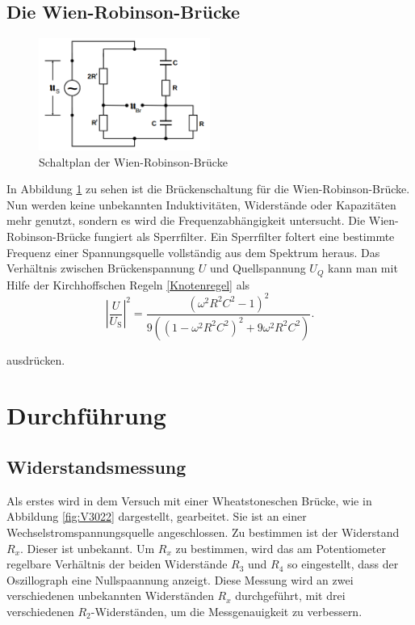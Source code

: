 \documentclass[
  bibliography=totoc,     %
  captions=tableheading,  %
  titlepage=firstiscover, %
]{scrartcl}
\begin{document}
\newpage
\subsection{Die Wien-Robinson-Brücke}
\begin{figure}[htb]
  \centering
  \includegraphics[width=0.5\textwidth]{V3026.png}
  \caption{Schaltplan der Wien-Robinson-Brücke}
  \label{fig:V3026}
\end{figure}
In Abbildung \ref{fig:V3026} zu sehen ist die Brückenschaltung für die
Wien-Robinson-Brücke. Nun werden keine unbekannten Induktivitäten, Widerstände
oder Kapazitäten mehr genutzt, sondern es wird die Frequenzabhängigkeit
untersucht. Die Wien-Robinson-Brücke fungiert als Sperrfilter. Ein Sperrfilter
foltert eine bestimmte Frequenz einer Spannungsquelle vollständig aus dem
Spektrum heraus. Das Verhältnis zwischen Brückenspannung $U$ und Quellspannung
$U_Q$ kann man mit Hilfe der Kirchhoffschen Regeln \ref{Knotenregel} als
\begin{equation}
    \label{eq:wien_robinson_1}
    \left|\frac{U}{U_{\mathup{S}}}\right|^2 = \frac{\left(\omega^2 R^2 C^2 - 1\right)^2}{9\left(\left(1 - \omega^2 R^2 C^2\right)^2 + 9 \omega^2 R^2 C^2\right)}.
\end{equation}

ausdrücken.
\newpage
\section{Durchführung}
\label{sec:durchführung}
\subsection{Widerstandsmessung}
Als erstes wird in dem Versuch mit einer Wheatstoneschen Brücke, wie in
Abbildung \ref{fig:V3022} dargestellt, gearbeitet. Sie ist an einer
Wechselstromspannungsquelle angeschlossen. Zu bestimmen ist der Widerstand $R_x$.
Dieser ist unbekannt. Um $R_x$ zu bestimmen, wird das am Potentiometer
regelbare Verhältnis der beiden Widerstände $R_3$ und $R_4$ so eingestellt, dass
der Oszillograph eine Nullspaannung anzeigt. Diese Messung wird an zwei
verschiedenen unbekannten Widerständen $R_x$ durchgeführt, mit drei verschiedenen
$R_2$-Widerständen, um die Messgenauigkeit zu verbessern.
\end{document}
